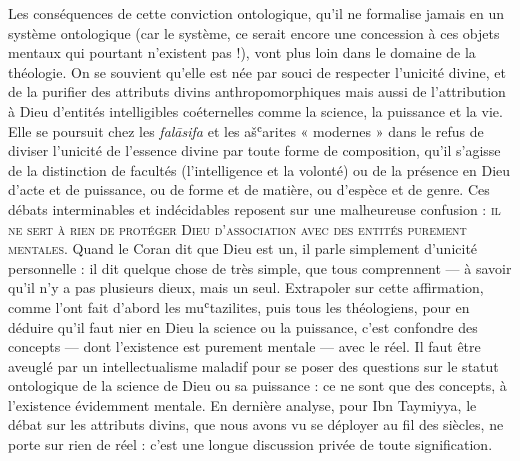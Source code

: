 Les conséquences de cette conviction ontologique, qu'il ne formalise
jamais en un système ontologique (car le système, ce serait encore une
concession à ces objets mentaux qui pourtant n'existent pas !), vont
plus loin dans le domaine de la théologie. On se souvient qu'elle est
née par souci de respecter l'unicité divine, et de la purifier des
attributs divins anthropomorphiques mais aussi de l'attribution à Dieu
d'entités intelligibles coéternelles comme la science, la puissance et
la vie. Elle se poursuit chez les \emph{falāsifa} et les ašʿarites
« modernes » dans le refus de diviser l'unicité de l'essence divine par
toute forme de composition, qu'il s'agisse de la distinction de facultés
(l'intelligence et la volonté) ou de la présence en Dieu d'acte et de
puissance, ou de forme et de matière, ou d'espèce et de genre. Ces
débats interminables et indécidables reposent sur une malheureuse
confusion : \textsc{il ne sert à rien de protéger Dieu d'association avec des
entités purement mentales}. Quand le Coran dit que Dieu est un, il parle
simplement d'unicité personnelle : il dit quelque chose de très simple,
que tous comprennent --- à savoir qu'il n'y a pas plusieurs dieux, mais
un seul. Extrapoler sur cette affirmation, comme l'ont fait d'abord les
muʿtazilites, puis tous les théologiens, pour en déduire qu'il faut nier
en Dieu la science ou la puissance, c'est confondre des concepts ---
dont l'existence est purement mentale --- avec le réel. Il faut être
aveuglé par un intellectualisme maladif pour se poser des questions sur
le statut ontologique de la science de Dieu ou sa puissance : ce ne sont
que des concepts, à l'existence évidemment mentale. En dernière analyse,
pour Ibn Taymiyya, le débat sur les attributs divins, que nous avons vu
se déployer au fil des siècles, ne porte sur rien de réel : c'est une
longue discussion privée de toute signification.

